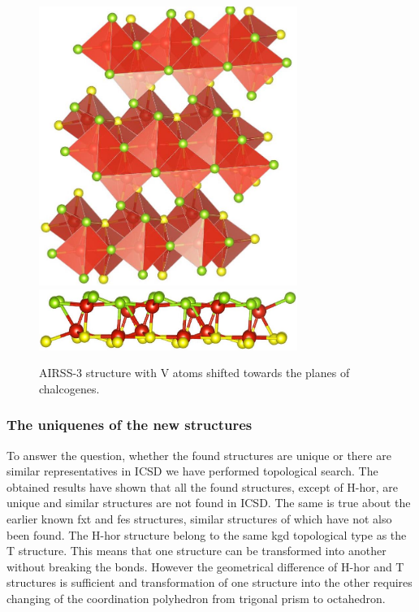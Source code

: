 \documentclass[a4paperm]{article}
\begin{document}
\begin{figure}[H]
        \includegraphics[width=0.75\textwidth]{airss-3-1.jpg} \\ \vspace{3mm}
        \includegraphics[width=0.75\textwidth]{airss-3-2.jpg}
        \caption{AIRSS-3 structure with V atoms shifted towards the planes of chalcogenes.}
\label{airss-3}
\end{figure}


\subsubsection{The uniquenes of the new structures}

To answer the question, whether the found structures are unique or there are similar representatives in ICSD we have performed topological search.
The obtained results have shown that all the found structures, except of H-hor, are unique and similar structures are not found in ICSD.
The same is true about the earlier known fxt and fes structures, similar structures of which have not also been found. 
The H-hor structure belong to the same kgd topological type as the T structure.
This means that one structure can be transformed into another without breaking the bonds.
However the geometrical difference of H-hor and T structures is sufficient and transformation of one structure into the other requires changing of the coordination polyhedron from trigonal prism to octahedron.
\end{document}
